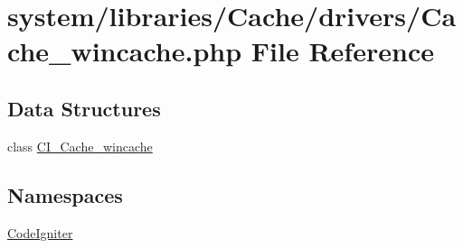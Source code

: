 \hypertarget{_cache__wincache_8php}{}\section{system/libraries/\+Cache/drivers/\+Cache\+\_\+wincache.php File Reference}
\label{_cache__wincache_8php}
\subsection*{Data Structures}
\begin{DoxyCompactItemize}
\item 
class \mbox{\hyperlink{class_c_i___cache__wincache}{C\+I\+\_\+\+Cache\+\_\+wincache}}
\end{DoxyCompactItemize}
\subsection*{Namespaces}
\begin{DoxyCompactItemize}
\item 
 \mbox{\hyperlink{namespace_code_igniter}{Code\+Igniter}}
\end{DoxyCompactItemize}

